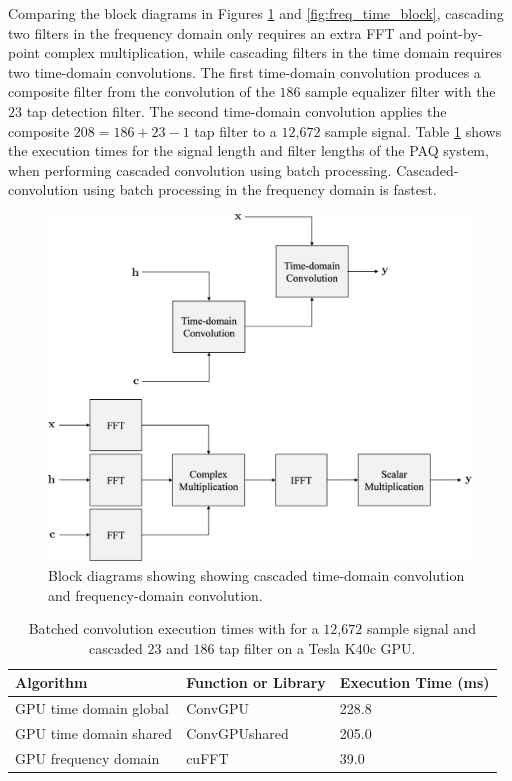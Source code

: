 Comparing the block diagrams in Figures \ref{fig:freq_time_block_cascade} and \ref{fig:freq_time_block}, cascading two filters in the frequency domain only requires an extra FFT and point-by-point complex multiplication, while cascading filters in the time domain requires two time-domain convolutions.
The first time-domain convolution produces a composite filter from the convolution of the $186$ sample equalizer filter with the $23$ tap detection filter.
The second time-domain convolution applies the composite $208 = 186 + 23 - 1$ tap filter to a $12$,$672$ sample signal.
Table \ref{tab:Batched_CPUvsGPUtable_12672_23_186} shows the execution times for the signal length and filter lengths of the PAQ system, when performing cascaded convolution using batch processing.
Cascaded-convolution using batch processing in the frequency domain is fastest.
\begin{figure}
	\centering\includegraphics[width=10.28in/100*55]{figures/gpu_convolution/CascadeConvBlock.pdf}
	\caption{Block diagrams showing showing cascaded time-domain convolution and frequency-domain convolution.}
	\label{fig:freq_time_block_cascade}
\end{figure}
\begin{table}
\captionsetup{width=6in}
\caption{Batched convolution execution times with for a $12$,$672$ sample signal and cascaded $23$ and $186$ tap filter on a Tesla K40c GPU.}
\begin{center}
\begin{tabular}{lll}
	\toprule
	Algorithm 				& Function or Library		& Execution Time (ms) \\ \midrule
	GPU time domain global 	& ConvGPU 					& 228.8		\\
	GPU time domain shared 	& ConvGPUshared 			& 205.0		\\
	GPU frequency domain 	& cuFFT						& 39.0		\\ 
	\bottomrule
\end{tabular}
\end{center}
\label{tab:Batched_CPUvsGPUtable_12672_23_186}
\end{table}



